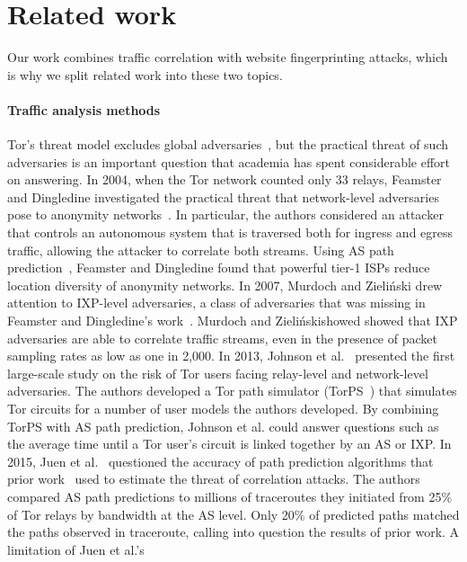 \section{Related work}
\label{sec:related_work}
Our work combines traffic correlation with website fingerprinting attacks,
which is why we split related work into these two topics.

\paragraph{Traffic analysis methods}
Tor's threat model excludes global adversaries~\cite{Dingledine2004a}, but the
practical threat of such adversaries is an important question that academia has
spent considerable effort on answering.  In 2004, when the Tor network counted
only 33 relays, Feamster and Dingledine investigated the practical threat that
network-level adversaries pose to anonymity networks~\cite{Feamster2004a}.  In
particular, the authors considered an attacker that controls an autonomous
system that is traversed both for ingress and egress traffic, allowing the
attacker to correlate both streams.  Using AS path prediction~\cite{Gao2001a},
Feamster and Dingledine found that powerful tier-1 ISPs reduce location
diversity of anonymity networks.  In 2007, Murdoch and Zieli\'{n}ski drew
attention to IXP-level adversaries, a class of adversaries that was missing in
Feamster and Dingledine's work~\cite{Murdoch2007a}.  Murdoch and
Zieli\'{n}skishowed showed that IXP adversaries are able to correlate traffic
streams, even in the presence of packet sampling rates as low as one in 2,000.
In 2013, Johnson et al.~\cite{Johnson2013a} presented the first large-scale
study on the risk of Tor users facing relay-level and network-level
adversaries.  The authors developed a Tor path simulator (TorPS~\cite{TorPS})
that simulates Tor circuits for a number of user models the authors developed.
By combining TorPS with AS path prediction, Johnson et al. could answer
questions such as the average time until a Tor user's circuit is linked
together by an AS or IXP.  In 2015, Juen et al.~\cite{Juen2015a} questioned the
accuracy of path prediction algorithms that prior
work~\cite{Johnson2013a,Feamster2004a} used to estimate the threat of
correlation attacks.  The authors compared AS path predictions to millions of
traceroutes they initiated from 25\% of Tor relays by bandwidth at the AS
level.  Only 20\% of predicted paths matched the paths observed in traceroute,
calling into question the results of prior work.  A limitation of Juen et al.'s

